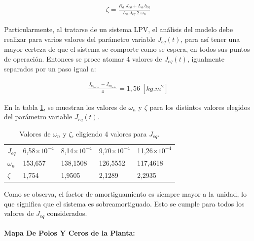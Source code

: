 \documentclass{article}
\begin{document}
\begin{sloppypar}
\begin{align} \label{eq:Factor de Amortiguamiento}
    \zeta=\frac{R_a.J_{eq}+L_a.b_{eq}}{L_a.J_{eq}\text{.2}.\omega_n}
\end{align}

Particularmente, al tratarse de un sistema LPV, el análisis del modelo debe realizar para varios valores del parámetro variable $J_{eq}(t)$, para así tener una mayor certeza de que el sistema se comporte como se espera, en todos sus puntos de operación. Entonces se proce atomar 4 valores de $J_{eq}(t)$, igualmente separados por un paso igual a:

\begin{align} \label{eq:Paso para la selección de los valores del parámetro variable J_eq(t)}
    \frac{J_{eq_{\text{máx.}}}-J_{eq_{\text{mín.}}}}{4}=1,56 ~[kg.m^2]
\end{align}

En la tabla \ref{table:Valores de omega_n y zeta, eligiendo 4 valores para J_eq}, se muestran los valores de $\omega_n$ y $\zeta$ para los distintos valores elegidos del parámetro variable $J_{eq}(t)$.

\begin{table}[H]
    \centering
    \begin{tabular}{|l|llll|}
    \cline{1-5}
    \textbf{$J_{eq}$}   & 6,58$\times10^{-4}$ & 8,14$\times10^{-4}$  & 9,70$\times10^{-4}$  & 11,26$\times10^{-4}$ \\ \cline{1-5}
    \textbf{$\omega_n$} & 153,657             & 138,1508             & 126,5552             & 117,4618             \\ \cline{1-5}
    \textbf{$\zeta$}    & 1,754               & 1,9505               & 2,1289               & 2,2935               \\ \cline{1-5}
    \end{tabular}
    \caption{\label{table:Valores de omega_n y zeta, eligiendo 4 valores para J_eq}Valores de $\omega_n$ y $\zeta$, eligiendo 4 valores para $J_{eq}$.}
\end{table}

Como se observa, el factor de amortiguamiento es siempre mayor a la unidad, lo que significa que el sistema es sobreamortiguado. Esto se cumple para todos los valores de $J_{eq}$ considerados.


\paragraph{Mapa De Polos Y Ceros de la Planta:}
\label{sec:Mapa De Polos Y Ceros de la Planta:}
\hfill


\end{sloppypar}
\end{document}
